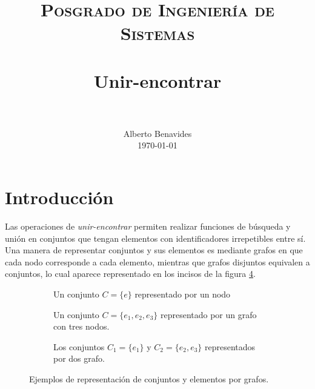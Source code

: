 \documentclass[paper=leter, fontsize=11pt]{scrartcl}
\title{
		\usefont{OT1}{bch}{b}{n}
		\normalfont \normalsize \textsc{Posgrado de Ingeniería de Sistemas} \\ [25pt]
		\horrule{0.5pt} \\[0.4cm]
		\huge Unir-encontrar \\
		\horrule{2pt} \\[0.5cm]
}
\author{
		\normalfont 								\normalsize
        Alberto Benavides\\[-3pt]		\normalsize
        \today
}
\date{}
\numberwithin{equation}{section}		%
\numberwithin{figure}{section}			%
\numberwithin{table}{section}				%
\begin{document}
\maketitle

\section{Introducción}

Las operaciones de \textit{unir-encontrar} permiten realizar funciones de búsqueda y unión en conjuntos que tengan elementos con identificadores irrepetibles entre sí. Una manera de representar conjuntos y sus elementos es mediante grafos en que cada nodo corresponde a cada elemento, mientras que grafos disjuntos equivalen a conjuntos, lo cual aparece representado en los incisos de la figura \ref{tres_grafos}.


\begin{figure}
    \begin{subfigure}{.45\textwidth}
        \centering
        \caption{Un conjunto $C = \{e\}$ representado por un nodo}
        \label{nodo}
    \end{subfigure}
    \hfill
    \begin{subfigure}{.45\textwidth}
        \centering
        \caption{Un conjunto \(C = \{e_1, e_2, e_3\}\) representado por un grafo con tres nodos.}
        \label{grafo}
    \end{subfigure}

    \vspace{1cm}
    
    \centering
    \begin{subfigure}{0.45\textwidth}
        \centering
        \caption{Los conjuntos \(C_1 = \{e_1\}\) y \(C_2 = \{e_2, e_3\}\) representados por dos grafo.}
        \label{grafos}
    \end{subfigure}

    \caption{Ejemplos de representación de conjuntos y elementos por grafos.}
    \label{tres_grafos}
\end{figure}
\end{document}
